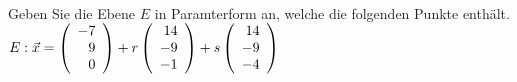 \begin{aufgabe} ~ \\ 
Geben Sie die Ebene $E$ in Paramterform an, welche die folgenden Punkte enthält.$E: \vec{x}=\Vekd{-7}{9}{0} + r\Vekd{14}{-9}{-1}+ s\Vekd{14}{-9}{-4}$\end{aufgabe} 

